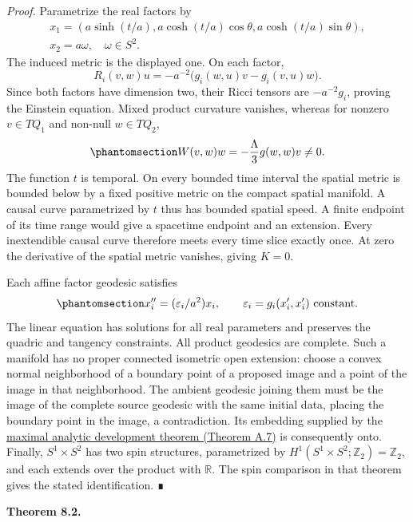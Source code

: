 \documentclass[
  english,
  11pt,
  reqno]{amsart}
\makeatletter
\newcommand{\pandocstatementheading}[1]{%
  \par\addpenalty{\@beginparpenalty}%
  \addvspace{.5\baselineskip plus .2\baselineskip minus .2\baselineskip}%
  {\normalfont\bfseries #1\par}%
  \nobreak\@afterindenttrue\@afterheading
}
\makeatother
\begin{document}
\emph{Proof.} Parametrize the real factors by \[
\begin{gathered}
x_1=(a\sinh(t/a),a\cosh(t/a)\cos\theta,
a\cosh(t/a)\sin\theta), \\
x_2=a\omega,
\quad\omega\in S^2.
\end{gathered}
\] The induced metric is the displayed one. On each factor, \[
R_i(v,w)u=-a^{-2}\bigl(g_i(w,u)v-g_i(v,u)w\bigr).
\] Since both factors have dimension two, their Ricci tensors are
\(-a^{-2}g_i\), proving the Einstein equation. Mixed product curvature
vanishes, whereas for nonzero \(v\in TQ_1\) and non-null \(w\in TQ_2\),
\begin{equation}\protect\phantomsection\label{eq:nariai-nonzero-weyl}{
W(v,w)w=-\frac{\Lambda}{3}g(w,w)v\ne0.
}\end{equation} The function \(t\) is temporal. On every bounded time
interval the spatial metric is bounded below by a fixed positive metric
on the compact spatial manifold. A causal curve parametrized by \(t\)
thus has bounded spatial speed. A finite endpoint of its time range
would give a spacetime endpoint and an extension. Every inextendible
causal curve therefore meets every time slice exactly once. At zero the
derivative of the spatial metric vanishes, giving \(K=0\).

Each affine factor geodesic satisfies
\begin{equation}\protect\phantomsection\label{eq:nariai-factor-geodesic-equation}{
x_i''=(\varepsilon_i/a^2)x_i,
\qquad\varepsilon_i=g_i(x_i',x_i')\ \text{constant}.
}\end{equation} The linear equation has solutions for all real
parameters and preserves the quadric and tangency constraints. All
product geodesics are complete. Such a manifold has no proper connected
isometric open extension: choose a convex normal neighborhood of a
boundary point of a proposed image and a point of the image in that
neighborhood. The ambient geodesic joining them must be the image of the
complete source geodesic with the same initial data, placing the
boundary point in the image, a contradiction. Its embedding supplied by
the \hyperref[thm:maximal-analytic-development-v2]{maximal analytic
development theorem (Theorem A.7)} is consequently onto. Finally,
\(S^1\times S^2\) has two spin structures, parametrized by
\(H^1(S^1\times S^2;\mathbb Z_2)=\mathbb Z_2\), and each extends over
the product with \(\mathbb R\). The spin comparison in that theorem
gives the stated identification. ∎

\pandocstatementheading{\protect{}\label{thm:nariai-no-hausdorff-whole-sky-carrier}Theorem 8.2.}
\end{document}
